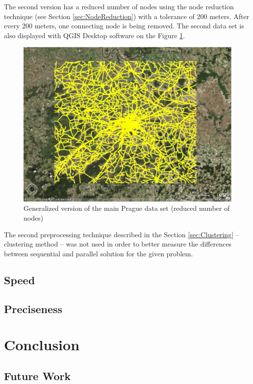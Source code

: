 \documentclass[thesis=M,english]{FITthesis}[2012/10/20]
\begin{document}
The second version has a reduced number of nodes using the node reduction technique (see Section \ref{sec:NodeReduction}) with a tolerance of 200 meters. After every 200 meters, one connecting node is being removed.
The second data set is also displayed with QGIS Desktop software on the Figure \ref{pic:dataset2}.
\begin{figure}[H]
\centering
\includegraphics[width=1\textwidth]{pics/praguedatasetS}
\caption{Generalized version of the main Prague data set (reduced number of nodes)}
\label{pic:dataset2}
\end{figure}

The second preprocessing technique described in the Section \ref{sec:Clustering} -- clustering method -- was not used in order to better measure the differences between sequential and parallel solution for the given problem. 

\section{Speed}

\section{Preciseness}

\chapter{Conclusion}

\section{Future Work}
\end{document}
